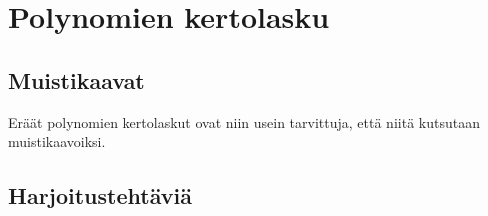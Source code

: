 \chapter{Polynomien kertolasku}

\section{Muistikaavat}

Eräät polynomien kertolaskut ovat niin usein tarvittuja, että niitä kutsutaan muistikaavoiksi.


\section{Harjoitustehtäviä}
